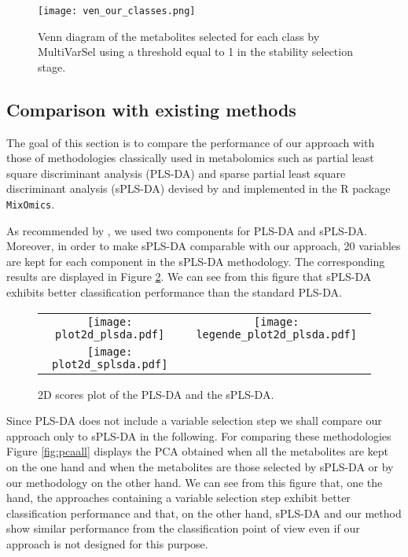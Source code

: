 \begin{figure}[!h]
\begin{center}
\texttt{[image: ven\_our\_classes.png]}
\vspace{-10mm}
\caption{Venn diagram of the metabolites selected for each class by  \textsf{MultiVarSel}
 using a threshold equal to 1 in the stability selection stage.\label{fig:real_boulier}}
\end{center}
\end{figure}


\subsection{Comparison with existing methods}


The goal of this section is to compare the performance of our approach with those of methodologies classically used in metabolomics 
such as partial least square discriminant analysis (PLS-DA) 
and sparse partial least square discriminant analysis (sPLS-DA) devised by \cite{LeCao2011} and implemented in the R package \verb|MixOmics|. 

As recommended by \cite{LeCao2011}, we used two components for PLS-DA and sPLS-DA. Moreover, in order to make sPLS-DA comparable with our approach, 
20 variables are kept for each component in the sPLS-DA methodology. The corresponding results  are
displayed in Figure \ref{fig:2dplsda}. We can see from this figure that sPLS-DA exhibits better classification performance than the standard PLS-DA. 



\begin{figure}[!h]
\centering
\begin{tabular}{cc}
\texttt{[image: plot2d\_plsda.pdf]} 
&\texttt{[image: legende\_plot2d\_plsda.pdf]} \\
\texttt{[image: plot2d\_splsda.pdf]} & \\
\end{tabular}
\caption{2D scores plot of the PLS-DA and the sPLS-DA.\label{fig:2dplsda}}
\end{figure}


Since PLS-DA does not include a variable selection step we shall compare our approach only to sPLS-DA in the following. 
For comparing these methodologies Figure \ref{fig:pcaall} displays the PCA obtained when all the metabolites are kept on the one hand 
and when the metabolites are those selected by sPLS-DA or by our methodology on the other hand. We can see from this figure that, one the hand,
the approaches containing a variable selection step exhibit better classification performance and that, on the other hand, 
sPLS-DA and our method show similar performance from the classification point of view even if our approach is not designed for this purpose.



